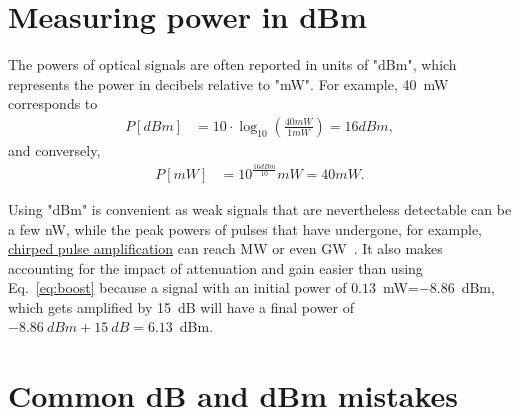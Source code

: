\section{Measuring power in dBm}
The powers of optical signals are often reported in units of "dBm", which represents the power in decibels relative to "mW". For example, 40~mW corresponds to
\begin{align}
    P [dBm] &= 10\cdot\log_{10}\left(\frac{40mW}{1mW} \right)=16dBm,
\end{align}
and conversely,
\begin{align}
    \label{eq:dBm_rev}
    P [mW] &= 10^{\frac{16dBm}{10}}mW=40mW.
\end{align}


Using "dBm" is convenient as weak signals that are nevertheless detectable can be a few nW, while the peak powers of pulses that have undergone, for example, \href{https://youtu.be/Eh5CHRWFT-M}{chirped pulse amplification} can reach MW or even GW~\cite{Chirp_STRICKLAND_Nobel_prize}. It also makes accounting for the impact of attenuation and gain easier than using Eq.~\ref{eq:boost} because a signal with an initial power of $0.13$~mW=$-8.86$~dBm, which gets amplified by 15~dB will have a final power of $-8.86~dBm+15~dB=6.13$~dBm.    


\section{Common dB and dBm mistakes}

